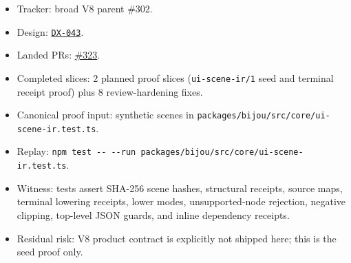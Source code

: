 \begin{itemize}
\tightlist
\item
  Tracker: broad V8 parent \#302.
\item
  Design: \href{https://github.com/flyingrobots/bijou/blob/cbd70612140e7a450d764b3c7be1c6af878b99bc/docs/design/DX-043-portable-bijou-blocks-and-multi-endpoint-ir.md}{\texttt{D\allowbreak{}X\allowbreak{}-\allowbreak{}0\allowbreak{}4\allowbreak{}3}}.
\item
  Landed PRs: \href{https://github.com/flyingrobots/bijou/pull/323}{\#323}.
\item
  Completed slices: 2 planned proof slices (\texttt{u\allowbreak{}i\allowbreak{}-\allowbreak{}s\allowbreak{}c\allowbreak{}e\allowbreak{}n\allowbreak{}e\allowbreak{}-\allowbreak{}i\allowbreak{}r\allowbreak{}/\allowbreak{}1} seed and terminal receipt proof) plus 8 review-hardening fixes.
\item
  Canonical proof input: synthetic scenes in \texttt{p\allowbreak{}a\allowbreak{}c\allowbreak{}k\allowbreak{}a\allowbreak{}g\allowbreak{}e\allowbreak{}s\allowbreak{}/\allowbreak{}b\allowbreak{}i\allowbreak{}j\allowbreak{}o\allowbreak{}u\allowbreak{}/\allowbreak{}s\allowbreak{}r\allowbreak{}c\allowbreak{}/\allowbreak{}c\allowbreak{}o\allowbreak{}r\allowbreak{}e\allowbreak{}/\allowbreak{}u\allowbreak{}i\allowbreak{}-\allowbreak{}s\allowbreak{}c\allowbreak{}e\allowbreak{}n\allowbreak{}e\allowbreak{}-\allowbreak{}i\allowbreak{}r\allowbreak{}.\allowbreak{}t\allowbreak{}e\allowbreak{}s\allowbreak{}t\allowbreak{}.\allowbreak{}t\allowbreak{}s}.
\item
  Replay: \texttt{n\allowbreak{}p\allowbreak{}m\allowbreak{} \allowbreak{}t\allowbreak{}e\allowbreak{}s\allowbreak{}t\allowbreak{} \allowbreak{}-\allowbreak{}-\allowbreak{} \allowbreak{}-\allowbreak{}-\allowbreak{}r\allowbreak{}u\allowbreak{}n\allowbreak{} \allowbreak{}p\allowbreak{}a\allowbreak{}c\allowbreak{}k\allowbreak{}a\allowbreak{}g\allowbreak{}e\allowbreak{}s\allowbreak{}/\allowbreak{}b\allowbreak{}i\allowbreak{}j\allowbreak{}o\allowbreak{}u\allowbreak{}/\allowbreak{}s\allowbreak{}r\allowbreak{}c\allowbreak{}/\allowbreak{}c\allowbreak{}o\allowbreak{}r\allowbreak{}e\allowbreak{}/\allowbreak{}u\allowbreak{}i\allowbreak{}-\allowbreak{}s\allowbreak{}c\allowbreak{}e\allowbreak{}n\allowbreak{}e\allowbreak{}-\allowbreak{}i\allowbreak{}r\allowbreak{}.\allowbreak{}t\allowbreak{}e\allowbreak{}s\allowbreak{}t\allowbreak{}.\allowbreak{}t\allowbreak{}s}.
\item
  Witness: tests assert SHA-256 scene hashes, structural receipts, source maps, terminal lowering receipts, lower modes, unsupported-node rejection, negative clipping, top-level JSON guards, and inline dependency receipts.
\item
  Residual risk: V8 product contract is explicitly not shipped here; this is the seed proof only.
\end{itemize}

